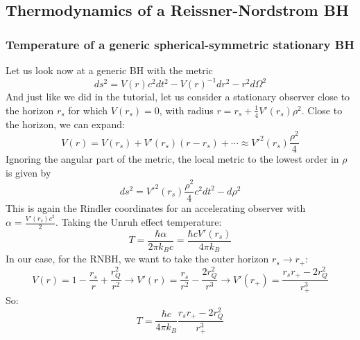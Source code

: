 \documentclass{article}
\begin{document}
\subsection{Thermodynamics of a Reissner-Nordstrom BH}
\subsubsection{Temperature of a generic spherical-symmetric stationary BH}
Let us look now at a generic BH with the metric
\begin{equation}
    ds^2 = V(r)c^2dt^2 - V(r)^{-1}dr^2 - r^2d\Omega^2
\end{equation}
And just like we did in the tutorial, let us consider a stationary observer close to the horizon $r_s$ for which $V(r_s) = 0$, with radius $r = r_s + \frac{1}{4}V'(r_s)\rho^2$. Close to the horizon, we can expand:
\begin{equation}
    V(r) = V(r_s) + V'(r_s)(r - r_s) + \cdots \approx V'^2(r_s) \frac{\rho^2}{4}
\end{equation}
Ignoring the angular part of the metric, the local metric to the lowest order in $\rho$ is given by
\begin{equation}
    ds^2 = V'^2(r_s) \frac{\rho^2}{4}c^2dt^2 - d\rho^2
\end{equation}
This is again the Rindler coordinates for an accelerating observer with $\alpha = \frac{V'(r_s)c^2}{2}$. Taking the Unruh effect temperature:
\begin{equation}
    T = \frac{\hbar \alpha}{2\pi k_B c} = \frac{\hbar c V'(r_s)}{4\pi k_B}
\end{equation}
In our case, for the RNBH, we want to take the outer horizon $r_s \rightarrow r_{+}$:
\begin{equation}
    V(r) = 1 - \frac{r_s}{r} + \frac{r_Q^2}{r^2}
    \rightarrow
    V'(r) = \frac{r_s}{r^2} - \frac{2r_Q^2}{r^3}
    \rightarrow
    V'(r_{+}) = \frac{r_sr_{+} - 2r_Q^2}{r_{+}^3}
\end{equation}
So:
\begin{equation}
    T = \frac{\hbar c}{4\pi k_B}\frac{r_sr_{+} - 2r_Q^2}{r_{+}^3}
\end{equation}
\end{document}
